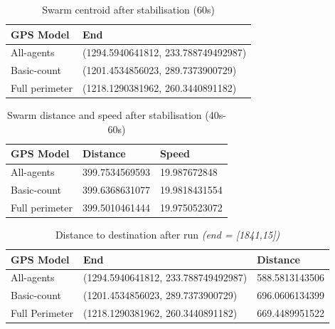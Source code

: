 \documentclass{ieeeaccess}
\begin{document}
\begin{table}
\begin{center}
\begin{tabular}{| l | l |}
\hline
GPS Model & End  \\ \hline
All-agents & (1294.5940641812, 233.788749492987) \\ \hline
Basic-count & (1201.4534856023, 289.7373900729) \\ \hline
Full perimeter & (1218.1290381962, 260.3440891182)\\ \hline
\end{tabular}\caption{Swarm centroid after stabilisation (60s)} \label{tab:SwarmSpeed2}
\end{center}
\end{table}

\begin{table}
\begin{center}
\begin{tabular}{| l | l | l |}
\hline
GPS Model & Distance & Speed \\ \hline
All-agents &  399.7534569593 & 19.987672848 \\  \hline
Basic-count & 399.6368631077 & 19.9818431554 \\ \hline
Full perimeter & 399.5010461444 & 19.9750523072 \\  \hline
\end{tabular}\caption{Swarm distance and speed after stabilisation (40s-60s)} \label{tab:SwarmSpeed3}
\end{center}
\end{table}

\begin{table}
\begin{center}
\begin{tabular}{| p{1.2cm} | l | l |}
\hline
GPS Model & End & Distance \\ \hline
All-agents & (1294.5940641812, 233.788749492987) & 588.5813143506\\ \hline
Basic-count & (1201.4534856023, 289.7373900729) & 696.0606134399\\ \hline
Full Perimeter & (1218.1290381962, 260.3440891182) & 669.4489951522\\ \hline
\end{tabular}\caption[Distance to destination after run]{Distance to destination after run \textit{(end = [1841,15])}}\label{tab:SwarmDistanceEnd}
\end{center}
\end{table}
\end{document}

